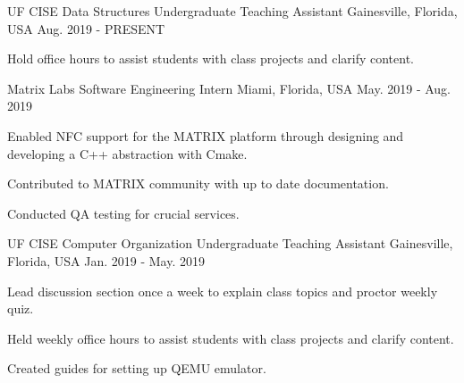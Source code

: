 
\begin{cventries}

  \cventry
    {UF CISE} %
    {Data Structures Undergraduate Teaching Assistant} %
    {Gainesville, Florida, USA} %
    {Aug. 2019 - PRESENT} %
    {
      \begin{cvitems} %
        \item {Hold office hours to assist students with class projects and clarify content.}
      \end{cvitems}
    }


  \cventry
    {Matrix Labs} %
    {Software Engineering Intern} %
    {Miami, Florida, USA} %
    {May. 2019 - Aug. 2019} %
    {
      \begin{cvitems} %
        \item {Enabled NFC support for the MATRIX platform through designing and developing a C++ abstraction with Cmake.}
        \item {Contributed to MATRIX community with up to date documentation.}
        \item {Conducted QA testing for crucial services.}
      \end{cvitems}
    }


  \cventry
    {UF CISE} %
    {Computer Organization Undergraduate Teaching Assistant} %
    {Gainesville, Florida, USA} %
    {Jan. 2019 - May. 2019} %
    {
      \begin{cvitems} %
        \item {Lead discussion section once a week to explain class topics and proctor weekly quiz.}
        \item {Held weekly office hours to assist students with class projects and clarify content.}
        \item {Created guides for setting up QEMU emulator.}
      \end{cvitems}
    }


\end{cventries}
